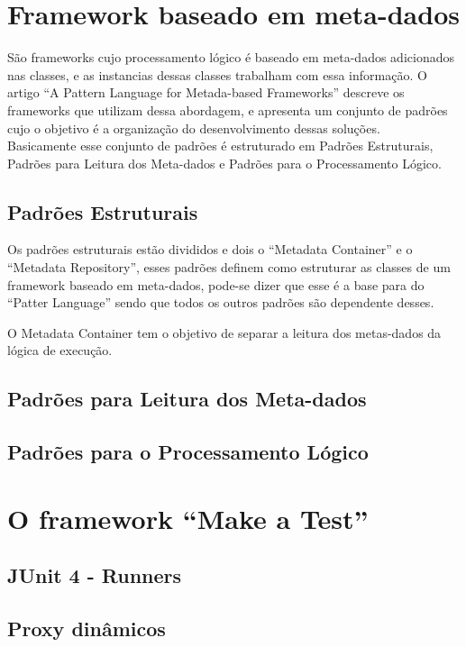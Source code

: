 \documentclass{abnt}
\begin{document}
\chapter{Framework baseado em meta-dados}
São frameworks cujo processamento lógico é baseado em meta-dados adicionados nas classes, e as instancias dessas classes trabalham com essa informação. O artigo ``A Pattern Language for Metada-based Frameworks'' \cite{GUERRA-PATTERN} descreve os frameworks que utilizam dessa abordagem, e apresenta um conjunto de padrões cujo o objetivo é a organização do desenvolvimento dessas soluções.\\

Basicamente esse conjunto de padrões é estruturado em Padrões Estruturais, Padrões para Leitura dos Meta-dados e Padrões para o Processamento Lógico.\\

\section{Padrões Estruturais}

Os padrões estruturais estão divididos e dois o ``Metadata Container'' e o ``Metadata Repository'', esses padrões definem como estruturar as classes de um framework baseado em meta-dados, pode-se dizer que esse é a base para do ``Patter Language'' sendo que todos os outros padrões são dependente desses.

O Metadata Container tem o objetivo de separar a leitura dos metas-dados da lógica de execução.


\section{Padrões para Leitura dos Meta-dados}
\section{Padrões para o Processamento Lógico}

\chapter{O framework ``Make a Test''}
\section{JUnit 4 - Runners}
\section{Proxy dinâmicos}
\end{document}
